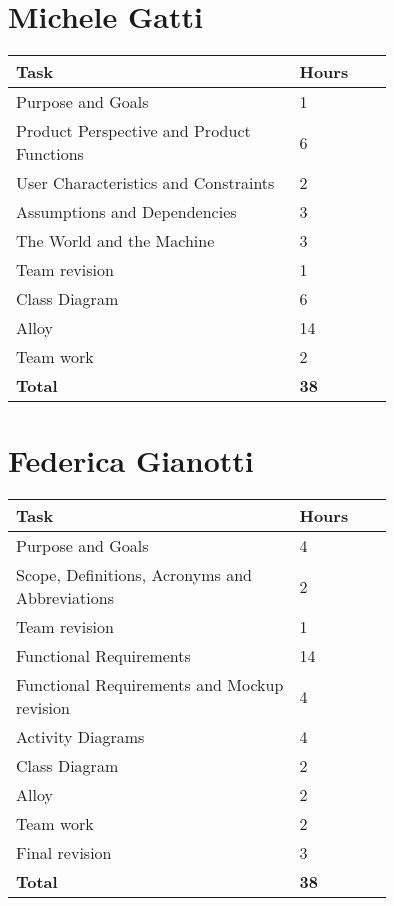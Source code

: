 \section{Michele Gatti}

\smallskip
\begin{center}
\begin{tabular}{ | p{0.75\linewidth} | l | }
  \hline
    \textbf{Task} & \textbf{Hours }\\ \hline
    Purpose and Goals & 1 \\ \hline
    Product Perspective and Product Functions & 6 \\ \hline
    User Characteristics and Constraints & 2 \\ \hline
    Assumptions and Dependencies & 3 \\ \hline
    The World and the Machine & 3 \\ \hline
    Team revision & 1 \\ \hline
    Class Diagram & 6 \\ \hline
    Alloy & 14 \\ \hline
    Team work & 2 \\ \hline
    \textbf{Total} & \textbf{38} \\ \hline
\end{tabular}
\end{center}
\smallskip


\section{Federica Gianotti}

\smallskip
\begin{center}
\begin{tabular}{ | p{0.75\linewidth} | l | }
  \hline
    \textbf{Task} & \textbf{Hours }\\ \hline
    Purpose and Goals & 4 \\ \hline
    Scope, Definitions, Acronyms and Abbreviations & 2 \\ \hline
    Team revision & 1 \\ \hline
    Functional Requirements & 14 \\ \hline
    Functional Requirements and Mockup revision & 4 \\ \hline
    Activity Diagrams & 4 \\ \hline
    Class Diagram & 2 \\ \hline
    Alloy & 2 \\ \hline
    Team work & 2 \\ \hline
    Final revision & 3 \\ \hline
    \textbf{Total} & \textbf{38} \\ \hline
\end{tabular}
\end{center}
\smallskip

